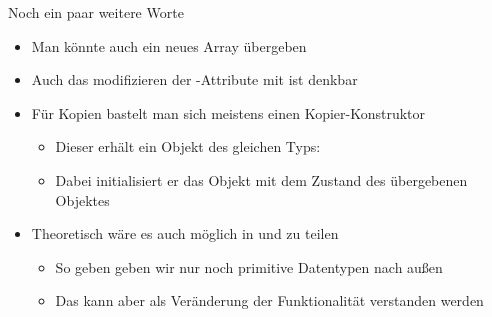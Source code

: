 \iffull
\begin{frame}{Noch ein paar weitere Worte}
    \begin{itemize}[<+(1)->]
        \itemsep8pt
        \item Man könnte auch ein neues Array übergeben
        \item Auch das modifizieren der -Attribute mit  ist denkbar
        \item Für Kopien bastelt man sich meistens einen Kopier-Konstruktor \begin{itemize}
            \item Dieser erhält ein Objekt des gleichen Typs: 
            \item Dabei initialisiert er das Objekt mit dem Zustand des übergebenen Objektes
        \end{itemize}
        \item Theoretisch wäre es auch möglich  in  und  zu teilen \begin{itemize}
            \item So geben geben wir nur noch primitive Datentypen nach außen
            \item Das kann aber als Veränderung der Funktionalität verstanden werden
        \end{itemize}
    \end{itemize}
\end{frame}
\fi

\iffull
{}
\immediate{}
